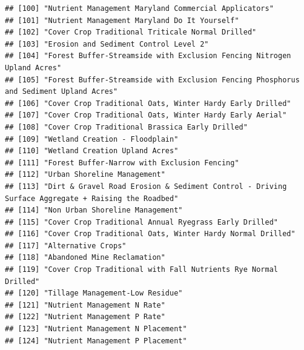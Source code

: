 \documentclass[
]{article}
\begin{document}
\begin{verbatim}
## [100] "Nutrient Management Maryland Commercial Applicators"                                            
## [101] "Nutrient Management Maryland Do It Yourself"                                                    
## [102] "Cover Crop Traditional Triticale Normal Drilled"                                                
## [103] "Erosion and Sediment Control Level 2"                                                           
## [104] "Forest Buffer-Streamside with Exclusion Fencing Nitrogen Upland Acres"                          
## [105] "Forest Buffer-Streamside with Exclusion Fencing Phosphorus and Sediment Upland Acres"           
## [106] "Cover Crop Traditional Oats, Winter Hardy Early Drilled"                                        
## [107] "Cover Crop Traditional Oats, Winter Hardy Early Aerial"                                         
## [108] "Cover Crop Traditional Brassica Early Drilled"                                                  
## [109] "Wetland Creation - Floodplain"                                                                  
## [110] "Wetland Creation Upland Acres"                                                                  
## [111] "Forest Buffer-Narrow with Exclusion Fencing"                                                    
## [112] "Urban Shoreline Management"                                                                     
## [113] "Dirt & Gravel Road Erosion & Sediment Control - Driving Surface Aggregate + Raising the Roadbed"
## [114] "Non Urban Shoreline Management"                                                                 
## [115] "Cover Crop Traditional Annual Ryegrass Early Drilled"                                           
## [116] "Cover Crop Traditional Oats, Winter Hardy Normal Drilled"                                       
## [117] "Alternative Crops"                                                                              
## [118] "Abandoned Mine Reclamation"                                                                     
## [119] "Cover Crop Traditional with Fall Nutrients Rye Normal Drilled"                                  
## [120] "Tillage Management-Low Residue"                                                                 
## [121] "Nutrient Management N Rate"                                                                     
## [122] "Nutrient Management P Rate"                                                                     
## [123] "Nutrient Management N Placement"                                                                
## [124] "Nutrient Management P Placement"                                                                

\end{verbatim}
\end{document}
